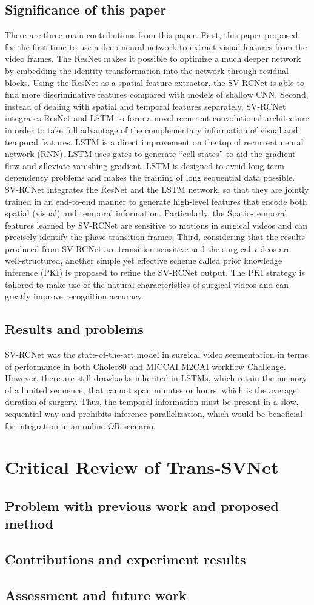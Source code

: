 \documentclass[11pt]{article} \usepackage[top=1in, bottom=1in, left=1in, right=1in]{geometry}
\begin{document}
\subsection{Significance of this paper}
There are three main contributions from this paper. First, this paper proposed for the first time to use a deep neural network to extract visual features from the video frames. The ResNet makes it possible to optimize a much deeper network by embedding the identity transformation into the network through residual blocks. Using the ResNet as a spatial feature extractor, the SV-RCNet is able to find more discriminative features compared with models of shallow CNN. Second, instead of dealing with spatial and temporal features separately, SV-RCNet integrates ResNet and LSTM to form a novel recurrent convolutional architecture in order to take full advantage of the complementary information of visual and temporal features. LSTM is a direct improvement on the top of recurrent neural network (RNN), LSTM uses gates to generate “cell states” to aid the gradient flow and alleviate vanishing gradient. LSTM is designed to avoid long-term dependency problems and makes the training of long sequential data possible. SV-RCNet integrates the ResNet and the LSTM network, so that they are jointly trained in an end-to-end manner to generate high-level features that encode both spatial (visual) and temporal information. Particularly, the Spatio-temporal features learned by SV-RCNet are sensitive to motions in surgical videos and can precisely identify the phase transition frames. Third, considering that the results produced from SV-RCNet are transition-sensitive and the surgical videos are well-structured, another simple yet effective scheme called prior knowledge inference (PKI) is proposed to refine the SV-RCNet output. The PKI strategy is tailored to make use of the natural characteristics of surgical videos and can greatly improve recognition accuracy. 
\subsection{Results and problems}
SV-RCNet was the state-of-the-art model in surgical video segmentation in terms of performance in both Cholec80 and MICCAI M2CAI workflow Challenge. However, there are still drawbacks inherited in LSTMs, which retain the memory of a limited sequence, that cannot span minutes or hours, which is the average duration of surgery. Thus, the temporal information must be present in a slow, sequential way and prohibits inference parallelization, which would be beneficial for integration in an online OR scenario. 


\section{Critical Review of Trans-SVNet}
\subsection{Problem with previous work and proposed method}
\subsection{Contributions and experiment results}
\subsection{Assessment and future work}

\newpage

\end{document}

